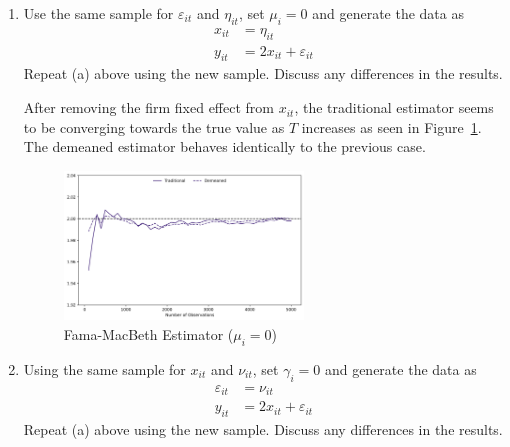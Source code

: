 \documentclass[12pt,twoside]{article}
\begin{document}
\begin{enumerate}[label = (\alph*)]
    \item Use the same sample for \(\varepsilon_{it}\) and \(\eta_{it}\), set \(\mu_i = 0\) and generate the data as
    \begin{align*}
        x_{it} & = \eta_{it} \\
        y_{it} & = 2x_{it} + \varepsilon_{it}
    \end{align*}
    Repeat (a) above using the new sample. Discuss any differences in the results.

    \begin{solution}
        After removing the firm fixed effect from \(x_{it}\), the traditional estimator seems to be converging towards the true value as \(T\) increases as seen in Figure~\ref{fig:beta_fm_b}. The demeaned estimator behaves identically to the previous case.
        \begin{figure}[!htbp]
            \centering
            \includegraphics[width=0.6\textwidth]{images/beta_fm_b}
            \caption{Fama-MacBeth Estimator (\(\mu_i = 0\))}
            \label{fig:beta_fm_b}
        \end{figure}        
    \end{solution}

    \item Using the same sample for \(x_{it}\) and \(\nu_{it}\), set \(\gamma_i = 0\) and generate the data as
    \begin{align*}
        \varepsilon_{it} & = \nu_{it} \\
        y_{it} & = 2x_{it} + \varepsilon_{it}
    \end{align*}
    Repeat (a) above using the new sample. Discuss any differences in the results.
        

\end{enumerate}
\end{document}
